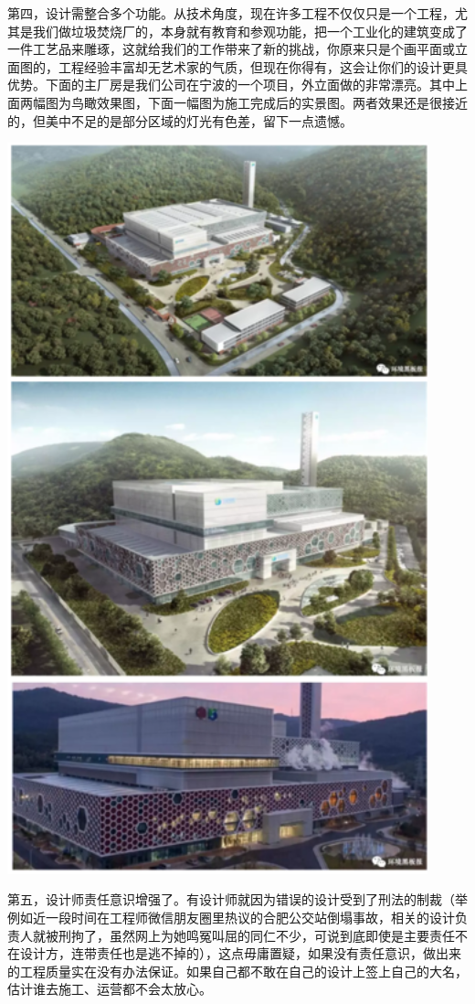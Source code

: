 \documentclass[
]{book}
\begin{document}
第四，设计需整合多个功能。从技术角度，现在许多工程不仅仅只是一个工程，尤其是我们做垃圾焚烧厂的，本身就有教育和参观功能，把一个工业化的建筑变成了一件工艺品来雕琢，这就给我们的工作带来了新的挑战，你原来只是个画平面或立面图的，工程经验丰富却无艺术家的气质，但现在你得有，这会让你们的设计更具优势。下面的主厂房是我们公司在宁波的一个项目，外立面做的非常漂亮。其中上面两幅图为鸟瞰效果图，下面一幅图为施工完成后的实景图。两者效果还是很接近的，但美中不足的是部分区域的灯光有色差，留下一点遗憾。

\includegraphics[width=4.79in]{images/sisi5}

第五，设计师责任意识增强了。有设计师就因为错误的设计受到了刑法的制裁（举例如近一段时间在工程师微信朋友圈里热议的合肥公交站倒塌事故，相关的设计负责人就被刑拘了，虽然网上为她鸣冤叫屈的同仁不少，可说到底即使是主要责任不在设计方，连带责任也是逃不掉的），这点毋庸置疑，如果没有责任意识，做出来的工程质量实在没有办法保证。如果自己都不敢在自己的设计上签上自己的大名，估计谁去施工、运营都不会太放心。
\end{document}

